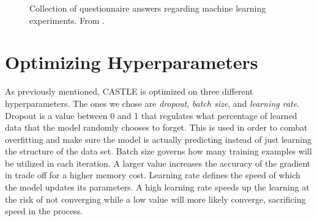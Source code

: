 \documentclass[nofilelist]{cslthse-msc}
\begin{document}
\begin{figure}[!ht]
\hfil
{}
\caption{Collection of questionnaire answers regarding machine learning experiments. From \citet{bouthillier:hal-02447823}.}
\label{fig:HAL}
\end{figure}








\section{Optimizing Hyperparameters}
As previously mentioned, CASTLE is optimized on three different hyperparameters. The ones we chose are \textit{dropout}\citep{hyperparameters}, \textit{batch size}, and \textit{learning rate}. Dropout is a value between 0 and 1 that regulates what percentage of learned data that the model randomly chooses to forget. This is used in order to combat overfitting and make sure the model is actually predicting instead of just learning the structure of the data set. Batch size governs how many training examples will be utilized in each iteration. A larger value increases the accuracy of the gradient in trade off for a higher memory cost. Learning rate defines the speed of which the model updates its parameters. A high learning rate speeds up the learning at the risk of not converging while a low value will more likely converge, sacrificing speed in the process.
\end{document}
